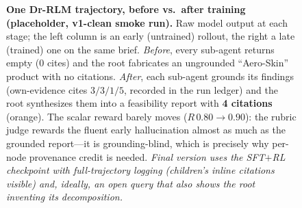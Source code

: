 \begin{figure}[t]
{}
\caption{\textbf{One Dr-RLM trajectory, before vs.\ after training (placeholder, v1-clean smoke run).}
Raw model output at each stage; the \textcolor{cBad}{left} column is an early (untrained) rollout, the
\textcolor{cII}{right} a late (trained) one on the same brief. \emph{Before}, every sub-agent returns
empty (0 cites) and the root fabricates an ungrounded ``Aero-Skin'' product with no citations.
\emph{After}, each sub-agent grounds its findings (own-evidence cites $3/3/1/5$, recorded in the run
ledger) and the root synthesizes them into a feasibility report with \textbf{4 citations}
(\textcolor{cIII}{orange}). The scalar reward barely moves ($R\,0.80\!\rightarrow\!0.90$):
the rubric judge rewards the fluent early hallucination almost as much as the grounded report---it is
grounding-blind, which is precisely why per-node provenance credit is needed.
\textit{Final version uses the SFT$+$RL checkpoint with full-trajectory logging (children's inline
citations visible) and, ideally, an open query that also shows the root inventing its decomposition.}}
\label{fig:trajectory-full}
\end{figure}
